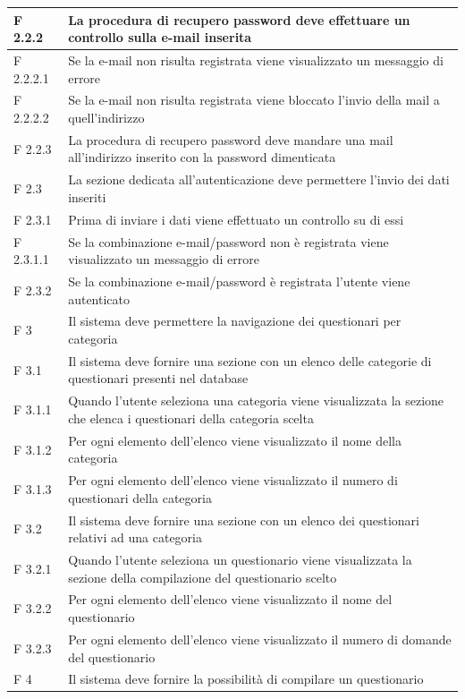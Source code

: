 \documentclass[a4paper,11pt]{article}
\begin{document}
\begin{longtable}{p{}p{}}
\midrule
F 2.2.2 & La procedura di recupero password deve effettuare un controllo sulla e-mail inserita\\
\midrule
F 2.2.2.1 & Se la e-mail non risulta registrata viene visualizzato un messaggio di errore\\
\midrule
F 2.2.2.2 & Se la e-mail non risulta registrata viene bloccato l'invio della mail a quell'indirizzo\\
\midrule
F 2.2.3 & La procedura di recupero password deve mandare una mail all'indirizzo inserito con la password dimenticata\\
\midrule
F 2.3 & La sezione dedicata all'autenticazione deve permettere l'invio dei dati inseriti\\
\midrule
F 2.3.1 & Prima di inviare i dati viene effettuato un controllo su di essi\\
\midrule
F 2.3.1.1 & Se la combinazione e-mail/password non è registrata viene visualizzato un messaggio di errore\\
\midrule
F 2.3.2 & Se la combinazione e-mail/password è registrata l'utente viene autenticato\\
\midrule
F 3 & Il sistema deve permettere la navigazione dei questionari per categoria\\
\midrule
F 3.1 & Il sistema deve fornire una sezione con un elenco delle categorie di questionari presenti nel database\\
\midrule
F 3.1.1 & Quando l'utente seleziona una categoria viene visualizzata la sezione che elenca i questionari della categoria scelta\\
\midrule
F 3.1.2 & Per ogni elemento dell'elenco viene visualizzato il nome della categoria\\
\midrule
F 3.1.3 & Per ogni elemento dell'elenco viene visualizzato il numero di questionari della categoria\\
\midrule
F 3.2 & Il sistema deve fornire una sezione con un elenco dei questionari relativi ad una categoria\\
\midrule
F 3.2.1 & Quando l'utente seleziona un questionario viene visualizzata la sezione della compilazione del questionario scelto\\
\midrule
F 3.2.2 & Per ogni elemento dell'elenco viene visualizzato il nome del questionario\\
\midrule
F 3.2.3 & Per ogni elemento dell'elenco viene visualizzato il numero di domande del questionario\\
\midrule
F 4 & Il sistema deve fornire la possibilità di compilare un questionario\\

\end{longtable}
\end{document}
